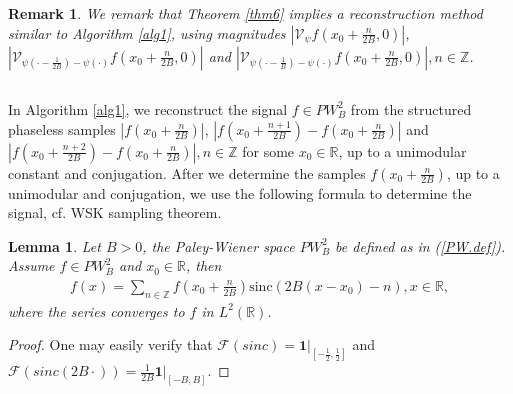 \documentclass[12pt,oneside,reqno]{amsart}
\newtheorem{lemma}[theorem]{Lemma}%
\newtheorem{remark}[theorem]{Remark}%
\newcommand{\Z}{\mathbb{Z}}
\newcommand{\R}{\mathbb{R}}
\numberwithin{equation}{section}
\begin{document}
\begin{remark}
	We remark that Theorem \ref{thm6} implies a reconstruction method similar to Algorithm \ref{alg1}, using magnitudes $ |\mathcal{V}_{\psi} f (x_0+\frac{n}{2B},0)|$, $|\mathcal{V}_{\psi(\cdot-\frac{1}{2B})-\psi(\cdot)} f (x_0+\frac{n}{2B},0)|$ and $|\mathcal{V}_{\psi(\cdot-\frac{1}{B})-\psi(\cdot)} f (x_0+\frac{n}{2B},0)|, n\in \Z$.
\end{remark}



\begin{appendices}
	\section{}
	
	
	
	
	
	
	
	
	
	
	
	
	
	
	
	
	In Algorithm \ref{alg1}, we reconstruct the signal $f\in PW_{B}^2$ from the structured phaseless samples $|f(x_0+\frac{n}{2B})|$, $|f(x_0+\frac{n+1}{2B})-f(x_0+\frac{n}{2B})|$ and $|f(x_0+\frac{n+2}{2B})-f(x_0+\frac{n}{2B})|, n\in \Z$ for some $x_0\in \R$, up to a unimodular constant and conjugation. After we determine the samples $f(x_0+\frac{n}{2B})$, up to a unimodular and conjugation, we use the following formula to determine the signal, cf. WSK sampling theorem. 
	
	
	\begin{lemma}\label{lem.WSK}
		Let $B>0$, the Paley-Wiener space $PW_B^2$ be defined as in (\ref{PW.def}). Assume $f\in PW_B^2$ and $x_0\in \R$, then
		\begin{align*}
			f(x) = \sum_{n\in \Z} f(x_0 + \frac{n}{2B}) \text{sinc} (2B(x-x_0)-n), x\in \R,
		\end{align*}
		where the series converges to $f$ in $L^2(\R)$.
	\end{lemma}
	\begin{proof}
		One may easily verify that $\mathcal{F}(sinc)= \textbf{1}|_{[-\frac{1}{2},\frac{1}{2}]}$ and $\mathcal{F}(sinc(2B\cdot))= \frac{1}{2B}\textbf{1}|_{[-B,B]}$.
		

\end{proof}
\end{appendices}
\end{document}
